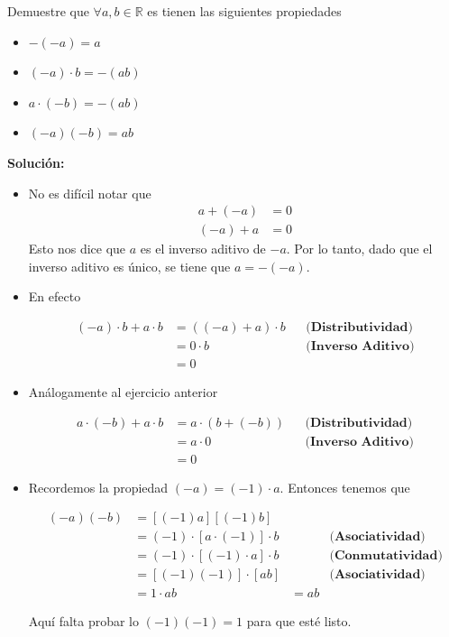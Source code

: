 \documentclass[12pt]{book}
\begin{document}
\begin{prob}
\quad \quad 
    Demuestre que $\forall a, b \in \mathbb{R}$ es tienen las siguientes propiedades 

    \begin{itemize}
        \item[\textbf{a)}] $-(-a)=a$
        \item[\textbf{b)}] $(-a) \cdot b=-(ab)$ 
        \item[\textbf{c)}] $a \cdot (-b) = -(ab)$
        \item[\textbf{d)}] $(-a)(-b)=ab$
    \end{itemize}
\end{prob}
\textbf{Solución:}
\begin{itemize}
    \item[\textbf{a)}] No es difícil notar que 
    \begin{align*}
        a+ (-a)&=0 \\
        (-a)+a&=0
    \end{align*}
    Esto nos dice que $a$ es el inverso aditivo de $-a$. Por lo tanto, dado que el inverso aditivo es único, se tiene que $a = -(-a)$.
      \item[\textbf{b)}] En efecto

      \begin{align*}
          (-a) \cdot b + a \cdot b&=((-a) + a ) \cdot b &&\textbf{(Distributividad)} \\
          &= 0 \cdot b && \textbf{(Inverso Aditivo)} \\
          &=0
      \end{align*}
\item[\textbf{c)}] Análogamente al ejercicio anterior 

\begin{align*}
    a \cdot (-b) + a\cdot b &= a \cdot (b + (-b)) && \textbf{(Distributividad)} \\
    &=a \cdot 0 && \textbf{(Inverso Aditivo)} \\
    &=0
\end{align*}
      \item[\textbf{d)}] Recordemos la propiedad $(-a)=(-1) \cdot a$. Entonces tenemos que 

      \begin{align*}
          (-a)(-b)&= [(-1)a][(-1)b]  \\
          &= (-1)\cdot[a \cdot (-1)] \cdot b && \textbf{(Asociatividad)} \\
          &=(-1) \cdot [(-1) \cdot a] \cdot b && \textbf{(Conmutatividad)} \\
          &= [(-1)(-1)]\cdot [ab] && \textbf{(Asociatividad)} \\
          &=1 \cdot ab 
          &=ab
      \end{align*}

      {\Large} Aquí falta probar lo $(-1)(-1)=1$ para que esté listo.
\end{itemize}
\end{document}

